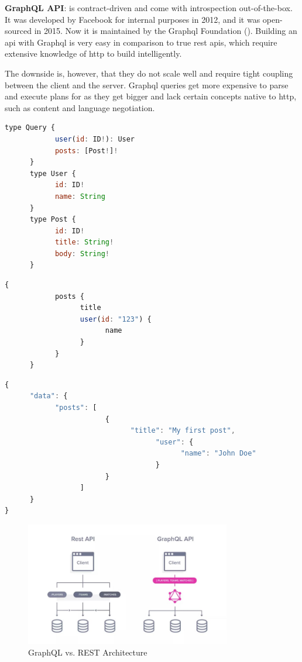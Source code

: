 \begin{multicols}{2}
    \textbf{GraphQL API}:
    is contract-driven and come with introspection out-of-the-box. It was developed by Facebook for internal purposes
    in 2012, and it was open-sourced in 2015. Now it is maintained by the Graph\acrshort{ql} Foundation (\cite{graphql}).
    Building an \acrshort{api} with Graph\acrshort{ql} is very easy in comparison to true \acrshort{rest} \acrshort{api}s,
    which require extensive knowledge of \acrshort{http} to build intelligently.

    The downside is, however, that they do not scale well and require tight coupling between the client and the
    server. Graph\acrshort{ql} queries get more expensive to parse and execute plans for as they get bigger and
    lack certain concepts native to \acrshort{http}, such as content and language negotiation.
\end{multicols}
\begin{lstlisting}[language=JavaScript, caption=GraphQL's Schema Example]
      type Query {
            user(id: ID!): User
            posts: [Post!]!
      }
      type User {
            id: ID!
            name: String
      }
      type Post {
            id: ID!
            title: String!
            body: String!
      }
\end{lstlisting}
\begin{lstlisting}[language=JavaScript, caption=GraphQL's Request Example to Specific Data]
      {
            posts {
                  title
                  user(id: "123") {
                        name
                  }
            }
      }
\end{lstlisting}
\begin{lstlisting}[language=JavaScript, caption=GraphQL's Return Data Example]
{
      "data": {
            "posts": [
                        {
                              "title": "My first post",
                                    "user": {
                                          "name": "John Doe"
                                    }
                        }
                  ]
      }
}            
\end{lstlisting}
\begin{figure}[htbp] %
    \centering
    \includegraphics[width=0.8\textwidth]{Figures/graphql.jpg}
    \caption{GraphQL vs. REST Architecture}
    \label{fig:graphqlvsrestarchitecture}
\end{figure}
